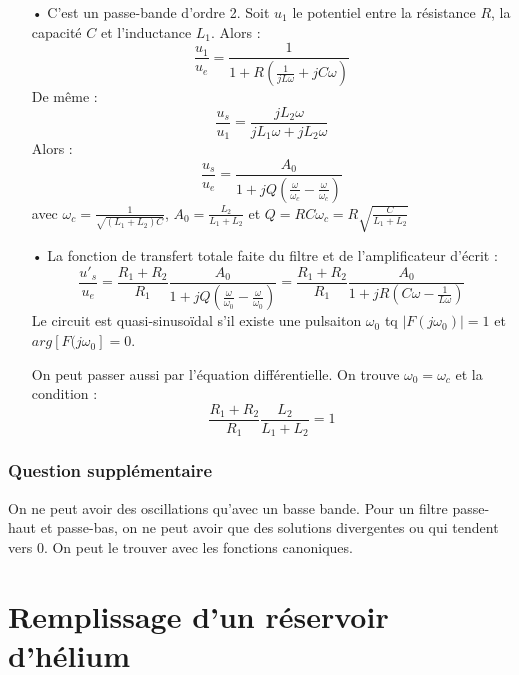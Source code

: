 \documentclass{report}
\begin{document}
\begin{itemize}
	\item[•] C'est un passe-bande d'ordre 2. Soit $u_1$ le potentiel entre la résistance $R$, la capacité $C$ et l'inductance $L_1$. Alors :
	\begin{equation}
		\frac{u_1}{u_e}=\frac{1}{1+R\left(\frac{1}{jL\omega}+ jC\omega \right) }
	\end{equation}
	De même :
	\begin{equation}
		\frac{u_s}{u_1}=\frac{jL_2\omega}{jL_1\omega+jL_2\omega}
	\end{equation}
	Alors : 
	\begin{equation}
		\frac{u_s}{u_e}=\frac{A_0}{1+jQ\left( \frac{\omega}{\omega_c}- \frac{\omega}{\omega_c}\right)}
	\end{equation}
	avec $\omega_c=\frac{1}{\sqrt{(L_1+L_2)C}}$, $A_0=\frac{L_2}{L_1+L_2}$ et $Q=RC\omega_c=R\sqrt{\frac{C}{L_1+L_2}}$
	
	\item[•] La fonction de transfert totale faite du filtre et de l'amplificateur d'écrit : 
		\begin{equation}
		\frac{u'_s}{u_e}=\frac{R_1+R_2}{R_1}\frac{A_0}{1+jQ\left( \frac{\omega}{\omega_0}- \frac{\omega}{\omega_0}\right)}=\frac{R_1+R_2}{R_1}\frac{A_0}{1+jR\left(C\omega- \frac{1}{L\omega}\right)}
	\end{equation}
	Le circuit est quasi-sinusoïdal s'il existe une pulsaiton $\omega_0$ tq $\mid F(j\omega_0)\mid=1$ et $arg\left[F(j\omega_0 \right] =0 $.
	
	On peut passer aussi par l'équation différentielle.
	On trouve $\omega_0=\omega_c$ et la condition :
	\begin{equation}
		\frac{R_1+R_2}{R_1}\frac{L_2}{L_1+L_2}=1
	\end{equation}
\end{itemize}

\subsubsection{Question supplémentaire}

On ne peut avoir des oscillations qu'avec un basse bande. Pour un filtre passe-haut et passe-bas, on ne peut avoir que des solutions divergentes ou qui tendent vers 0. On peut le trouver avec les fonctions canoniques.
	
\section*{Remplissage d'un réservoir d'hélium}
\end{document}
